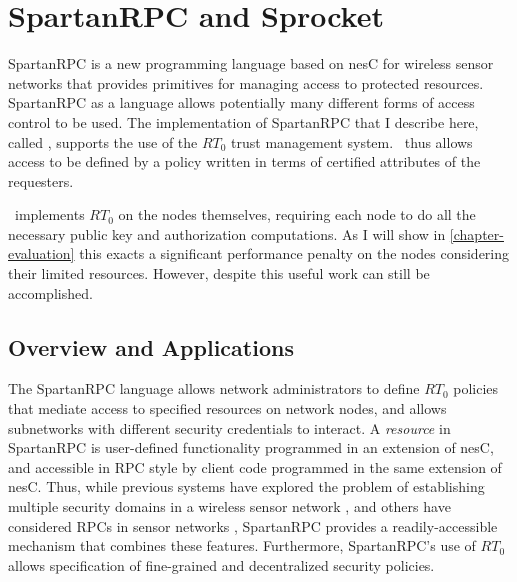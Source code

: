 
\chapter{SpartanRPC and Sprocket}
\label{chapter-spartanrpc-sprocket}

SpartanRPC is a new programming language based on nesC for wireless sensor networks that
provides primitives for managing access to protected resources. SpartanRPC as a language allows
potentially many different forms of access control to be used. The implementation of SpartanRPC
that I describe here, called \Sprocket \cite{sprocket}, supports the use of the $RT_0$ trust
management system. \Sprocket\ thus allows access to be defined by a policy written in terms of
certified attributes of the requesters.

\Sprocket\ implements $RT_0$ on the nodes themselves, requiring each node to do all the
necessary public key and authorization computations. As I will show in
\autoref{chapter-evaluation} this exacts a significant performance penalty on the nodes
considering their limited resources. However, despite this useful work can still be
accomplished.

\section{Overview and Applications}
\label{section-overview}

The SpartanRPC language allows network administrators to define $RT_0$ policies that mediate
access to specified resources on network nodes, and allows subnetworks with different security
credentials to interact. A \emph{resource} in SpartanRPC is user-defined functionality
programmed in an extension of nesC, and accessible in RPC style by client code programmed in the
same extension of nesC. Thus, while previous systems have explored the problem of establishing
multiple security domains in a wireless sensor network \cite{Claycomb:2011:NNL:1889383.1889450},
and others have considered RPCs in sensor networks \cite{may-tinyrpc-2007}, SpartanRPC provides
a readily-accessible mechanism that combines these features. Furthermore, SpartanRPC's use of
$RT_0$ allows specification of fine-grained and decentralized security policies.


